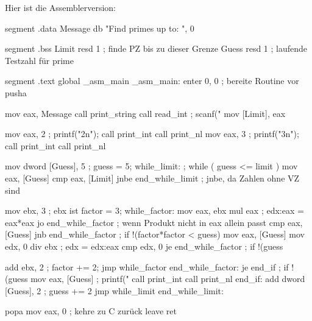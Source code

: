 \pagebreak[2] Hier ist die Assemblerversion: 
\begin{AsmCodeListing}[label=prime.asm, commandchars=\\\{\}]
 segment .data
 Message db      "Find primes up to: ", 0

 segment .bss
 Limit   resd    1                    ; finde PZ bis zu dieser Grenze
 Guess   resd    1                    ; laufende Testzahl f\"{u}r prime

 segment .text
         global  _asm_main
 _asm_main:
         enter   0, 0                 ; bereite Routine vor
         pusha

         mov     eax, Message
         call    print_string
         call    read_int             ; scanf("%
         mov     [Limit], eax

         mov     eax, 2               ; printf("2n");
         call    print_int
         call    print_nl
         mov     eax, 3               ; printf("3n");
         call    print_int
         call    print_nl

         mov     dword [Guess], 5     ; guess = 5;
 while_limit:                         ; while ( guess <= limit )
         mov     eax, [Guess]
         cmp     eax, [Limit]
         jnbe    end_while_limit      ; jnbe, da Zahlen ohne VZ sind

         mov     ebx, 3               ; ebx ist factor = 3;
 while_factor:
         mov     eax, ebx
         mul     eax                  ; edx:eax = eax*eax
         jo      end_while_factor     ; wenn Produkt nicht in eax allein passt
         cmp     eax, [Guess]
         jnb     end_while_factor     ; if !(factor*factor < guess)
         mov     eax, [Guess]
         mov     edx, 0
         div     ebx                  ; edx = edx:eax %
         cmp     edx, 0
         je      end_while_factor     ; if !(guess %

         add     ebx, 2               ; factor += 2;
         jmp     while_factor
 end_while_factor:
         je      end_if               ; if !(guess %
         mov     eax, [Guess]         ; printf("%
         call    print_int
         call    print_nl
 end_if:
         add     dword [Guess], 2     ; guess += 2
         jmp     while_limit
 end_while_limit:

         popa
         mov     eax, 0               ; kehre zu C zur\"{u}ck
         leave
         ret
\end{AsmCodeListing}
